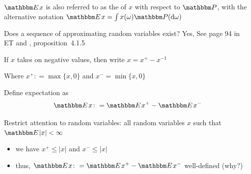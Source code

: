 \begin{frame}
    
    \vspace{2em}
    $\EE x$ is also referred to as
    the  of $x$ with respect to $\PP$, with the
    alternative notation
        $\EE x = \int x(\omega) \PP(\diff \omega)$
    
    \vspace{1em}
    Does a sequence of approximating random variables exist? 
    Yes, See page 94 in ET and \cite{dudley2002real}, proposition~4.1.5
    
\end{frame}

\begin{frame}

    \vspace{2em}
    If $x$ takes on negative values, then write $x = x^{+} - x^{-1}$
    
    Where $x^{+}\colon = \max\{x,0\}$ and $x^{-} = \min\{x,0\}$
    
    Define expectation as
    \begin{equation*}
        \EE x \colon = \EE x^{+} - \EE x^{-}
    \end{equation*}

    \vspace{.7em}
    Restrict
    attention to  random variables: all random
    variables $x$ such that $\EE |x| < \infty$
    \begin{itemize}
        \item we have $x^+ \leq |x|$ and $x^-
            \leq |x|$
        \item thus, $\EE x \colon = \EE x^{+} - \EE x^{-}$ well-defined (why?)
    \end{itemize}
    
\end{frame}

